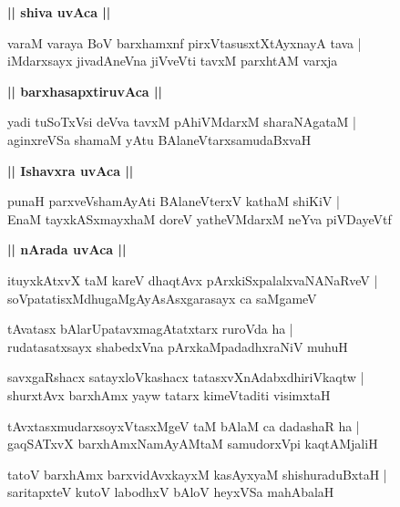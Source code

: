 \documentclass[twoside,12pt,openright]{book}
\newcounter{shloka}[chapter]
\def\uvaca#1{\centerline{{\large\textbf{#1}}}}
\begin{document}
\uvaca{|| shiva uvAca ||}

\begin{shloka}%
varaM varaya BoV barxhamxnf pirxVtasusxtXtAyxnayA tava |\\
iMdarxsayx jivadAneVna jiVveVti tavxM parxhtAM varxja
\end{shloka}

\uvaca{|| barxhasapxtiruvAca ||}

\begin{shloka}%
yadi tuSoTxVsi deVva tavxM pAhiVMdarxM sharaNAgataM |\\
aginxreVSa shamaM yAtu BAlaneVtarxsamudaBxvaH 
\end{shloka}

\uvaca{|| Ishavxra uvAca ||}

\begin{shloka}%
punaH parxveVshamAyAti BAlaneVterxV kathaM shiKiV |\\
EnaM tayxkASxmayxhaM doreV yatheVMdarxM neYva piVDayeVtf 
\end{shloka}

\uvaca{|| nArada uvAca ||}

\begin{shloka}%
ituyxkAtxvX taM kareV dhaqtAvx pArxkiSxpalalxvaNANaRveV |\\
soVpatatisxMdhugaMgAyAsAsxgarasayx ca saMgameV 
\end{shloka}

\begin{shloka}%
tAvatasx bAlarUpatavxmagAtatxtarx ruroVda ha |\\
rudatasatxsayx shabedxVna pArxkaMpadadhxraNiV muhuH 
\end{shloka}

\begin{shloka}%
savxgaRshacx satayxloVkashacx tatasxvXnAdabxdhiriVkaqtw |\\
shurxtAvx barxhAmx yayw tatarx kimeVtaditi visimxtaH 
\end{shloka}

\begin{shloka}%
tAvxtasxmudarxsoyxVtasxMgeV taM bAlaM ca dadashaR ha |\\
gaqSATxvX barxhAmxNamAyAMtaM samudorxVpi kaqtAMjaliH
\end{shloka}

\begin{shloka}%
tatoV barxhAmx barxvidAvxkayxM kasAyxyaM shishuraduBxtaH |\\
saritapxteV kutoV labodhxV bAloV heyxVSa mahAbalaH 
\end{shloka}
\end{document}
